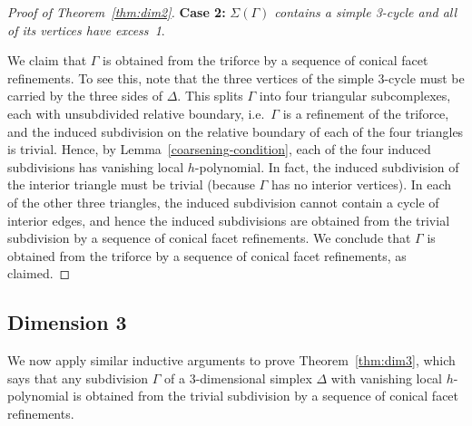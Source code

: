 \documentclass[10pt]{amsart}
\newenvironment{proofsection}[2]{\par\smallskip\noindent\textbf{#1} \emph{#2}.\par\nobreak}{\par\smallskip}
\newcommand{\ie}{i.e.\ }
\begin{document}
\begin{proof}[Proof of Theorem~\ref{thm:dim2}]
\begin{proofsection}{Case 2:}{$\Sigma(\Gamma)$ contains a simple 3-cycle and all of its vertices have excess~1}
We claim that $\Gamma$ is obtained from the triforce by a sequence of conical facet refinements. To see this, note that the three vertices of the simple 3-cycle must be carried by the three sides of $\Delta$. This splits $\Gamma$ into four 
triangular subcomplexes, each with unsubdivided relative boundary, \ie $\Gamma$ is a refinement of the triforce, and the induced subdivision on the relative boundary of each of the four triangles is trivial. Hence, by Lemma~\ref{coarsening-condition}, each of the four induced subdivisions has vanishing local $h$-polynomial. In fact, the induced subdivision of the interior triangle must be trivial (because $\Gamma$ has no interior vertices). In each of the other three triangles, the induced subdivision cannot contain a cycle of interior edges, and hence the induced subdivisions are obtained from the trivial subdivision by a sequence of conical facet refinements. We conclude that $\Gamma$ is obtained from the triforce by a sequence of conical facet refinements, as claimed.\qedhere
\end{proofsection}
\end{proof}

\subsection{Dimension 3}

We now apply similar inductive arguments to prove Theorem~\ref{thm:dim3}, which says that any subdivision $\Gamma$ of a 3-dimensional simplex $\Delta$ with vanishing local $h$-polynomial is obtained from the trivial subdivision by a sequence of conical facet refinements.
\end{document}
